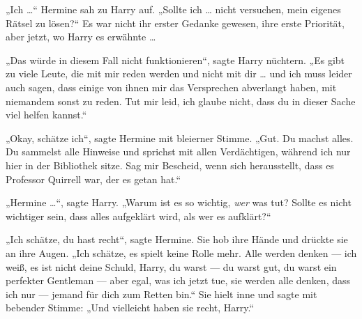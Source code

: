 „Ich …“ Hermine sah zu Harry auf.
„Sollte ich … nicht versuchen, mein eigenes Rätsel zu lösen?“ Es war nicht ihr erster Gedanke gewesen, ihre erste Priorität, aber jetzt, wo Harry es erwähnte …

„Das würde in diesem Fall nicht funktionieren“, sagte Harry nüchtern.
„Es gibt zu viele Leute, die mit mir reden werden und nicht mit dir … und ich muss leider auch sagen, dass einige von ihnen mir das Versprechen abverlangt haben, mit niemandem sonst zu reden. Tut mir leid, ich glaube nicht, dass du in dieser Sache viel helfen kannst.“

„Okay, schätze ich“, sagte Hermine mit bleierner Stimme.
„Gut. Du machst alles. Du sammelst alle Hinweise und sprichst mit allen Verdächtigen, während ich nur hier in der Bibliothek sitze. Sag mir Bescheid, wenn sich herausstellt, dass es Professor Quirrell war, der es getan hat.“

„Hermine …“, sagte Harry.
„Warum ist es so wichtig, \emph{wer} was tut? Sollte es nicht wichtiger sein, dass alles aufgeklärt wird, als wer es aufklärt?“

„Ich schätze, du hast recht“, sagte Hermine. Sie hob ihre Hände und drückte sie an ihre Augen.
„Ich schätze, es spielt keine Rolle mehr. Alle werden denken — ich weiß, es ist nicht deine Schuld, Harry, du warst — du warst gut, du warst ein perfekter Gentleman — aber egal, was ich jetzt tue, sie werden alle denken, dass ich nur — jemand für dich zum Retten bin.“ Sie hielt inne und sagte mit bebender Stimme:
„Und vielleicht haben sie recht, Harry.“

